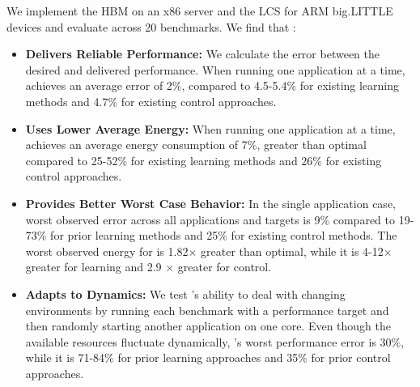 We implement the HBM on an x86 server and the LCS for ARM big.LITTLE
devices and evaluate across 20 benchmarks.  We find that \SYSTEM{}:
\begin{itemize}
\item \textbf{Delivers Reliable Performance: } We calculate the error
  between the desired and delivered performance.  When running one
  application at a time, \SYSTEM{} achieves an average error of 2\%,
  compared to 4.5-5.4\% for existing learning methods and 4.7\% for
  existing control approaches.
\item \textbf{Uses Lower Average Energy:} When running one application
  at a time, \SYSTEM{} achieves an average energy consumption of 7\%,
  greater than optimal compared to 25-52\% for existing learning
  methods and 26\% for existing control approaches.
\item \textbf{Provides Better Worst Case Behavior:} In the single
  application case, \SYSTEM{} worst observed error across all
  applications and targets is 9\% compared to 19-73\% for prior
  learning methods and 25\% for existing control methods.  The worst
  observed energy for \SYSTEM{} is 1.82$\times$ greater than optimal,
  while it is 4-12$\times$ greater for learning and 2.9 $\times$
  greater for control.
\item \textbf{Adapts to Dynamics:} We test \SYSTEM{}'s ability to deal
  with changing environments by running each benchmark with a
  performance target and then randomly starting another application on
  one core.  Even though the available resources fluctuate
  dynamically, \SYSTEM{}'s worst performance error is 30\%, while it
  is 71-84\% for prior learning approaches and 35\% for prior control
  approaches.
\end{itemize}
